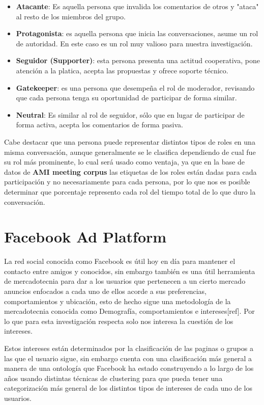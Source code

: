 \begin{itemize}\break

\item \textbf{Atacante}: Es aquella persona que invalida los comentarios de otros y "ataca" al resto de los miembros del grupo.
\item \textbf{Protagonista}: es aquella persona que inicia las conversaciones, asume un rol de autoridad. En este caso es un rol muy valioso para nuestra investigación.
\item \textbf{Seguidor (Supporter)}: esta persona presenta una actitud cooperativa, pone atención a la platica, acepta las propuestas y ofrece soporte técnico.
\item \textbf{Gatekeeper}: es una persona que desempeña el rol de moderador, revisando que cada persona tenga su oportunidad de participar de forma similar.
\item \textbf{Neutral}: Es similar al rol de seguidor, sólo que en lugar de participar de forma activa, acepta los comentarios de forma pasiva.
\end{itemize}

Cabe destacar que una persona puede representar distintos tipos de roles en una misma conversación, aunque generalmente se le clasifica dependiendo de cual fue su rol más prominente, lo cual será usado como ventaja, ya que en la base de datos de \textbf{AMI meeting corpus} las etiquetas de los roles están dadas para cada participación y no necesariamente para cada persona, por lo que nos es posible determinar que porcentaje represento cada rol del tiempo total de lo que duro la conversación.

\section{Facebook Ad Platform} 
La red social conocida como Facebook es útil hoy en día para mantener el contacto entre amigos y conocidos, sin embargo también es una útil herramienta de mercadotecnia para dar a los usuarios que pertenecen a un cierto mercado anuncios enfocados a cada uno de ellos acorde a sus preferencias, comportamientos y ubicación, esto de hecho sigue una metodología de la mercadotecnia conocida como Demografía, comportamientos e  intereses[ref]. Por lo que para esta investigación respecta solo nos interesa la cuestión de los intereses. 

Estos intereses están determinados por la clasificación de las paginas o grupos a las que el usuario sigue, sin embargo cuenta con una clasificación más general a manera de una ontología que Facebook ha estado construyendo a lo largo de los años usando distintas técnicas de clustering para que pueda tener una categorización más general de los distintos tipos de intereses de cada uno de los usuarios.


